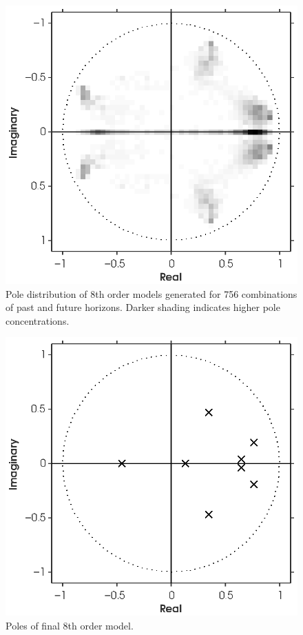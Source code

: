\newpage
\begin{figure}[htb!]
	\centering
	\includegraphics{../fig/poles_all.eps}
	\caption{Pole distribution of 8th order models generated for 756 combinations of past and future horizons. Darker shading indicates higher pole concentrations.}
\end{figure}
\begin{figure}[htb!]
	\centering
	\includegraphics{../fig/poles_1760.eps}
	\caption{Poles of final 8th order model.}
\end{figure}\clearpage



